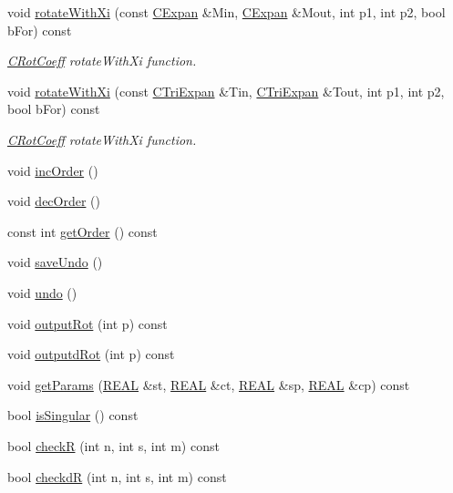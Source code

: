 \begin{DoxyCompactItemize}
void \hyperlink{classCRotCoeff_a109f259f6c38c7fc050a9524dbae6bae}{rotate\-With\-Xi} (const \hyperlink{classCExpan}{C\-Expan} \&Min, \hyperlink{classCExpan}{C\-Expan} \&Mout, int p1, int p2, bool b\-For) const 
\begin{DoxyCompactList}\small\item\em \hyperlink{classCRotCoeff}{C\-Rot\-Coeff} rotate\-With\-Xi function. \end{DoxyCompactList}\item 
void \hyperlink{classCRotCoeff_ab25aef3ee99aa2038cb66fc05b44d6b1}{rotate\-With\-Xi} (const \hyperlink{classCTriExpan}{C\-Tri\-Expan} \&Tin, \hyperlink{classCTriExpan}{C\-Tri\-Expan} \&Tout, int p1, int p2, bool b\-For) const 
\begin{DoxyCompactList}\small\item\em \hyperlink{classCRotCoeff}{C\-Rot\-Coeff} rotate\-With\-Xi function. \end{DoxyCompactList}\item 
void \hyperlink{classCRotCoeff_a1416603a77ab7c9b7af515a7bad684f1}{inc\-Order} ()
\item 
void \hyperlink{classCRotCoeff_ae9fa83e941510deeda3aac1b8aecc58b}{dec\-Order} ()
\item 
const int \hyperlink{classCRotCoeff_a639db3de3db977bbf9c98bd2fe423476}{get\-Order} () const 
\item 
void \hyperlink{classCRotCoeff_acf2c3650570013fee7e54491fa1d5920}{save\-Undo} ()
\item 
void \hyperlink{classCRotCoeff_a976ea6ff504912701f549e988fd217dc}{undo} ()
\item 
void \hyperlink{classCRotCoeff_a505db8551887fabe49b0f7b6076c2060}{output\-Rot} (int p) const 
\item 
void \hyperlink{classCRotCoeff_a23dff497ccb1ca53dba01af9a27fdab8}{outputd\-Rot} (int p) const 
\item 
void \hyperlink{classCRotCoeff_a27b0198e460737ea20601fa4f0667df5}{get\-Params} (\hyperlink{util_8h_a5821460e95a0800cf9f24c38915cbbde}{R\-E\-A\-L} \&st, \hyperlink{util_8h_a5821460e95a0800cf9f24c38915cbbde}{R\-E\-A\-L} \&ct, \hyperlink{util_8h_a5821460e95a0800cf9f24c38915cbbde}{R\-E\-A\-L} \&sp, \hyperlink{util_8h_a5821460e95a0800cf9f24c38915cbbde}{R\-E\-A\-L} \&cp) const 
\item 
bool \hyperlink{classCRotCoeff_a4668070c3eacacf17be98bc2fb348287}{is\-Singular} () const 
\item 
bool \hyperlink{classCRotCoeff_a9edced64385c044fe51074614c7857a9}{check\-R} (int n, int s, int m) const 
\item 
bool \hyperlink{classCRotCoeff_a232dcb4f4118a19f58e631564ecb7e99}{checkd\-R} (int n, int s, int m) const 
\end{DoxyCompactItemize}
